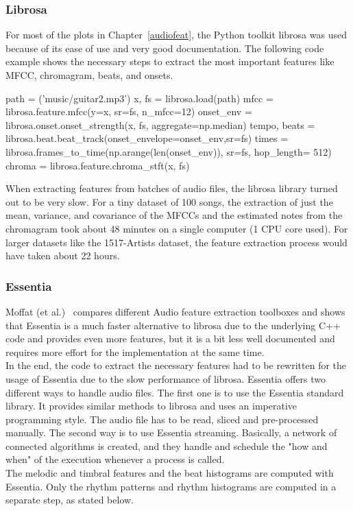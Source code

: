 \subsubsection{Librosa}

For most of the plots in Chapter~\ref{audiofeat}, the Python toolkit librosa was used because of its ease of use and very good documentation. The following code example shows the necessary steps to extract the most important features like MFCC, chromagram, beats, and onsets.
\lstset{language=Python} 
\begin{pythonCode}[frame=single,label={lst:Librosa},caption={Librosa},captionpos=b]
path = ('music/guitar2.mp3')
x, fs = librosa.load(path)
mfcc = librosa.feature.mfcc(y=x, sr=fs, n_mfcc=12)
onset_env = librosa.onset.onset_strength(x, fs, aggregate=np.median)
tempo, beats = librosa.beat.beat_track(onset_envelope=onset_env,sr=fs)
times = librosa.frames_to_time(np.arange(len(onset_env)), sr=fs, hop_length= 512)
chroma = librosa.feature.chroma_stft(x, fs)
\end{pythonCode}	
When extracting features from batches of audio files, the librosa library turned out to be very slow. For a tiny dataset of 100 songs, the extraction of just the mean, variance, and covariance of the MFCCs and the estimated notes from the chromagram took about 48 minutes on a single computer (1 CPU core used). 
For larger datasets like the 1517-Artists dataset, the feature extraction process would have taken about 22 hours. 

\subsubsection{Essentia}

Moffat (et al.)~\cite{audiofeattoolb} compares different Audio feature extraction toolboxes and shows that Essentia is a much faster alternative to librosa due to the underlying C++ code and provides even more features, but it is a bit less well documented and requires more effort for the implementation at the same time.\\ 
In the end, the code to extract the necessary features had to be rewritten for the usage of Essentia due to the slow performance of librosa. Essentia offers two different ways to handle audio files. The first one is to use the Essentia standard library. It provides similar methods to librosa and uses an imperative programming style. The audio file has to be read, sliced and pre-processed manually. The second way is to use Essentia streaming. Basically, a network of connected algorithms is created, and they handle and schedule the "how and when" of the execution whenever a process is called.\\
The melodic and timbral features and the beat histograms are computed with Essentia. Only the rhythm patterns and rhythm histograms are computed in a separate step, as stated below. 

